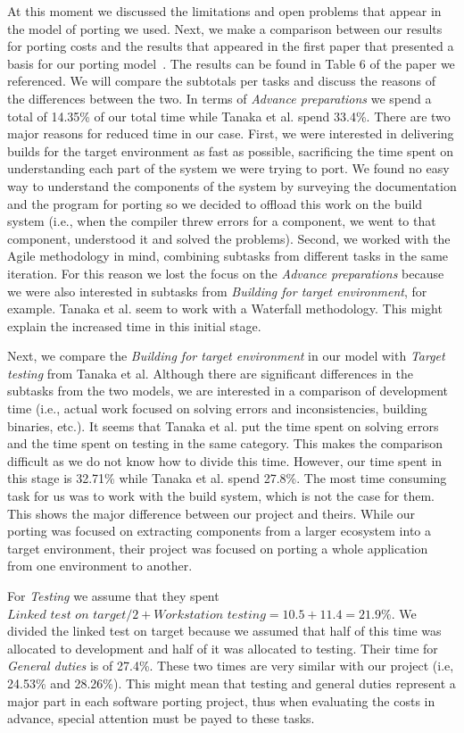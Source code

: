 At this moment we discussed the limitations and open problems that appear in the
model of porting we used. Next, we make a comparison between our results for
porting costs and the results that appeared in the first paper that presented a
basis for our porting model~\cite{tanaka}. The results can be found in Table 6 of
the paper we referenced. We will compare the subtotals per tasks and discuss the
reasons of the differences between the two. In terms of \textit{Advance
preparations} we spend a total of 14.35\% of our total time while Tanaka et al.
spend 33.4\%. There are two major reasons for reduced time in our case. First,
we were interested in delivering builds for the target environment as fast as
possible, sacrificing the time spent on understanding each part of the system we
were trying to port. We found no easy way to understand the components of the
system by surveying the documentation and the program for porting so we decided
to offload this work on the build system (i.e., when the compiler threw errors
for a component, we went to that component, understood it and solved the
problems). Second, we worked with the Agile methodology in mind, combining
subtasks from different tasks in the same iteration. For this reason we
lost the focus on the \textit{Advance preparations} because we were also
interested in subtasks from \textit{Building for target environment}, for
example. Tanaka et al. seem to work with a Waterfall methodology. This might
explain the increased time in this initial stage.

Next, we compare the \textit{Building for target environment} in our model with
\textit{Target testing} from Tanaka et al.  Although there are significant
differences in the subtasks from the two models, we are interested in a
comparison of development time (i.e., actual work focused on solving errors and
inconsistencies, building binaries, etc.). It seems that Tanaka et al. put the
time spent on solving errors and the time spent on testing in the same category.
This makes the comparison difficult as we do not know how to divide this time.
However, our time spent in this stage is 32.71\% while Tanaka et al. spend
27.8\%. The most time consuming task for us was to work with the build system,
which is not the case for them. This shows the major difference between our
project and theirs. While our porting was focused on extracting components from
a larger ecosystem into a target environment, their project was focused on
porting a whole application from one environment to another.

For \textit{Testing} we assume that they spent $\textit{Linked test on target} /
2 + \textit{Workstation testing} = 10.5 + 11.4 = 21.9\%$. We divided the linked
test on target because we assumed that half of this time was allocated to
development and half of it was allocated to testing. Their time for
\textit{General duties} is of 27.4\%. These two times are very similar with our
project (i.e, 24.53\% and 28.26\%). This might mean that testing and general
duties represent a major part in each software porting project, thus when
evaluating the costs in advance, special attention must be payed to these tasks.

